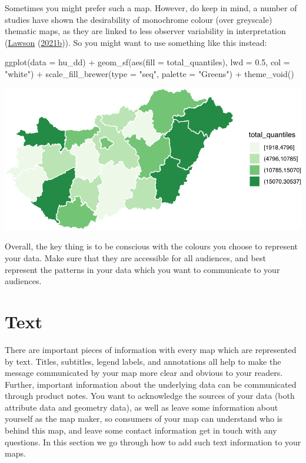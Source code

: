 \documentclass[
]{book}
\newenvironment{Shaded}{\begin{snugshade}}{\end{snugshade}}
\newcommand{\AttributeTok}[1]{\textcolor[rgb]{0.77,0.63,0.00}{#1}}
\newcommand{\FloatTok}[1]{\textcolor[rgb]{0.00,0.00,0.81}{#1}}
\newcommand{\FunctionTok}[1]{\textcolor[rgb]{0.00,0.00,0.00}{#1}}
\newcommand{\NormalTok}[1]{#1}
\newcommand{\SpecialCharTok}[1]{\textcolor[rgb]{0.00,0.00,0.00}{#1}}
\newcommand{\StringTok}[1]{\textcolor[rgb]{0.31,0.60,0.02}{#1}}
\begin{document}
Sometimes you might prefer such a map. However, do keep in mind, a number of studies have shown the desirability of monochrome colour (over greyscale) thematic maps, as they are linked to less observer variability in interpretation (\protect\hyperlink{ref-Lawson_2006}{Lawson} (\protect\hyperlink{ref-Lawson_2006}{2021b})). So you might want to use something like this instead:

\begin{Shaded}
\begin{Highlighting}[]
\FunctionTok{ggplot}\NormalTok{(}\AttributeTok{data =}\NormalTok{ hu\_dd) }\SpecialCharTok{+} 
  \FunctionTok{geom\_sf}\NormalTok{(}\FunctionTok{aes}\NormalTok{(}\AttributeTok{fill =}\NormalTok{ total\_quantiles), }\AttributeTok{lwd =} \FloatTok{0.5}\NormalTok{, }\AttributeTok{col =} \StringTok{"white"}\NormalTok{) }\SpecialCharTok{+} 
  \FunctionTok{scale\_fill\_brewer}\NormalTok{(}\AttributeTok{type =} \StringTok{"seq"}\NormalTok{, }\AttributeTok{palette =} \StringTok{"Greens"}\NormalTok{) }\SpecialCharTok{+} 
  \FunctionTok{theme\_void}\NormalTok{()}
\end{Highlighting}
\end{Shaded}

\includegraphics{crime_mapping_files/figure-latex/unnamed-chunk-159-1.pdf}

Overall, the key thing is to be conscious with the colours you choose to represent your data. Make sure that they are accessible for all audiences, and best represent the patterns in your data which you want to communicate to your audiences.

\hypertarget{text}{%
\section{Text}\label{text}}

There are important pieces of information with every map which are represented by text. Titles, subtitles, legend labels, and annotations all help to make the message communicated by your map more clear and obvious to your readers. Further, important information about the underlying data can be communicated through product notes. You want to acknowledge the sources of your data (both attribute data and geometry data), as well as leave some information about yourself as the map maker, so consumers of your map can understand who is behind this map, and leave some contact information get in touch with any questions. In this section we go through how to add such text information to your maps.
\end{document}
